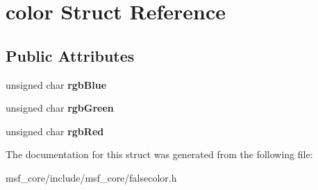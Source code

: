 \hypertarget{structcolor}{\section{color Struct Reference}
\label{structcolor}
}
\subsection*{Public Attributes}
\begin{DoxyCompactItemize}
\item 
\hypertarget{structcolor_aafc5982901c82342e14ffa4051b4cc69}{unsigned char {\bfseries rgb\-Blue}}\label{structcolor_aafc5982901c82342e14ffa4051b4cc69}

\item 
\hypertarget{structcolor_acb9158eaf99c44902c7fb7b33cc4c55c}{unsigned char {\bfseries rgb\-Green}}\label{structcolor_acb9158eaf99c44902c7fb7b33cc4c55c}

\item 
\hypertarget{structcolor_acbe14f26a6eb30162279a5309a77721d}{unsigned char {\bfseries rgb\-Red}}\label{structcolor_acbe14f26a6eb30162279a5309a77721d}

\end{DoxyCompactItemize}


The documentation for this struct was generated from the following file\-:\begin{DoxyCompactItemize}
\item 
msf\-\_\-core/include/msf\-\_\-core/falsecolor.\-h\end{DoxyCompactItemize}
